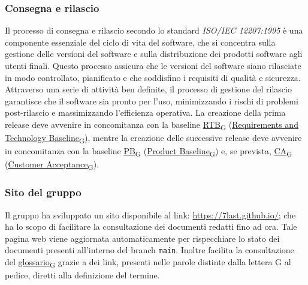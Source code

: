 \subsubsection{Consegna e rilascio}
Il processo di consegna e rilascio secondo lo standard \textit{ISO/IEC 12207:1995} è una componente essenziale del ciclo di vita del software, che si concentra sulla gestione delle versioni del software e sulla distribuzione dei prodotti software agli utenti finali. Questo processo assicura che le versioni del software siano rilasciate in modo controllato, pianificato e che soddisfino i requisiti di qualità e sicurezza. Attraverso una serie di attività ben definite, il processo di gestione del rilascio garantisce che il software sia pronto per l'uso, minimizzando i rischi di problemi post-rilascio e massimizzando l'efficienza operativa. La creazione della prima release deve avvenire in concomitanza con la baseline \href{https://7last.github.io/docs/pb/documentazione-interna/glossario\#requirements-and-technology-baseline}{RTB\textsubscript{G}} (\href{https://7last.github.io/docs/pb/documentazione-interna/glossario\#requirements-and-technology-baseline}{Requirements and Technology Baseline\textsubscript{G}}), mentre la creazione delle successive release deve avvenire in concomitanza con la baseline \href{https://7last.github.io/docs/pb/documentazione-interna/glossario\#product-baseline}{PB\textsubscript{G}} (\href{https://7last.github.io/docs/pb/documentazione-interna/glossario\#product-baseline}{Product Baseline\textsubscript{G}}) e, se prevista, \href{https://7last.github.io/docs/pb/documentazione-interna/glossario\#customer-acceptance}{CA\textsubscript{G}} (\href{https://7last.github.io/docs/pb/documentazione-interna/glossario\#customer-acceptance}{Customer Acceptance\textsubscript{G}}).

\subsubsection{Sito del gruppo}
Il gruppo ha sviluppato un sito disponibile al link: \url{https://7last.github.io/}; che ha lo scopo di facilitare la consultazione dei documenti redatti fino ad ora. Tale pagina web viene aggiornata automaticamente per rispecchiare lo stato dei documenti presenti all'interno del branch \texttt{main}. Inoltre facilita la consultazione del \href{https://7last.github.io/docs/pb/documentazione-interna/glossario\#glossario}{glossario\textsubscript{G}} grazie a dei link, presenti nelle parole distinte dalla lettera G al pedice, diretti alla definizione del termine.

